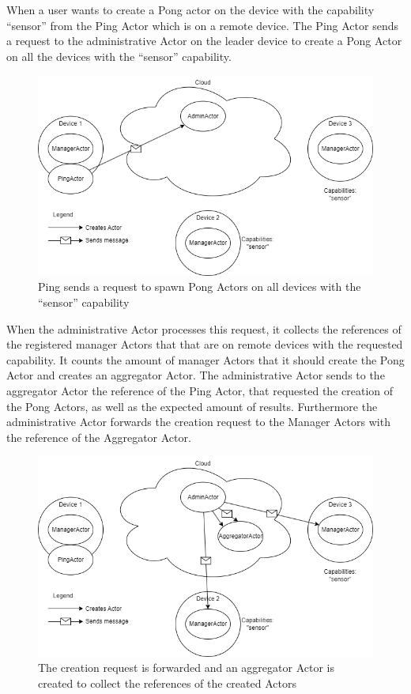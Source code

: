 \documentclass[a4paper]{article}
\begin{document}
When a user wants to create a Pong actor on the device with the capability \enquote{sensor} from the Ping Actor which is on a remote device. The Ping Actor sends a request to the administrative Actor on the leader device to create a Pong Actor on all the devices with the \enquote{sensor} capability.
\begin{figure}[H]
    \centering
    \includegraphics[scale=0.5]{createActor1.png}
    \caption{Ping sends a request to spawn Pong Actors on all devices with the \enquote{sensor} capability}
    \label{fig:createActor1}
\end{figure}
When the administrative Actor processes this request, it collects the references of the registered manager Actors that that are on remote devices with the requested capability. It counts the amount of manager Actors that it should create the Pong Actor and creates an aggregator Actor. The administrative Actor sends to the aggregator Actor the reference of the Ping Actor, that requested the creation of the Pong Actors, as well as the expected amount of results. Furthermore the administrative Actor forwards the creation request to the Manager Actors with the reference of the Aggregator Actor.
\begin{figure}[H]
    \centering
    \includegraphics[scale=0.5]{createActor2.png}
    \caption{The creation request is forwarded and an aggregator Actor is created to collect the references of the created Actors}
    \label{fig:createActor2}
\end{figure}
\end{document}
